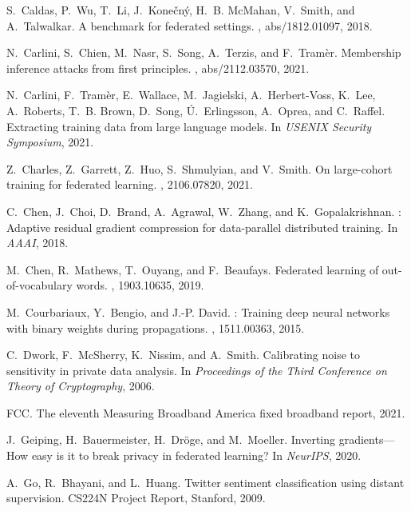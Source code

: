 \documentclass[11pt]{article}
\begin{document}
\begin{thebibliography}{10}
\begin{small}
S.~Caldas, P.~Wu, T.~Li, J.~Kone{\v{c}}n{\'y}, H.~B. McMahan, V.~Smith, and
  A.~Talwalkar.
 {A} benchmark for federated settings.
, abs/1812.01097, 2018.

N.~Carlini, S.~Chien, M.~Nasr, S.~Song, A.~Terzis, and F.~Tram{\`{e}}r.
\newblock Membership inference attacks from first principles.
, abs/2112.03570, 2021.

N.~Carlini, F.~Tram{\`{e}}r, E.~Wallace, M.~Jagielski, A.~Herbert{-}Voss,
  K.~Lee, A.~Roberts, T.~B. Brown, D.~Song, {\'{U}}.~Erlingsson, A.~Oprea, and
  C.~Raffel.
\newblock Extracting training data from large language models.
\newblock In {\em {USENIX} Security Symposium}, 2021.

Z.~Charles, Z.~Garrett, Z.~Huo, S.~Shmulyian, and V.~Smith.
\newblock On large-cohort training for federated learning.
, 2106.07820, 2021.

C.~Chen, J.~Choi, D.~Brand, A.~Agrawal, W.~Zhang, and K.~Gopalakrishnan.
: Adaptive residual gradient compression for data-parallel
  distributed training.
\newblock In {\em AAAI}, 2018.

M.~Chen, R.~Mathews, T.~Ouyang, and F.~Beaufays.
\newblock Federated learning of out-of-vocabulary words.
, 1903.10635, 2019.

M.~Courbariaux, Y.~Bengio, and J.-P. David.
: Training deep neural networks with binary weights
  during propagations.
, 1511.00363, 2015.

C.~Dwork, F.~McSherry, K.~Nissim, and A.~Smith.
\newblock Calibrating noise to sensitivity in private data analysis.
\newblock In {\em Proceedings of the Third Conference on Theory of
  Cryptography}, 2006.

FCC.
\newblock The eleventh {Measuring Broadband America} fixed broadband report,
  2021.

J.~Geiping, H.~Bauermeister, H.~Dr\"{o}ge, and M.~Moeller.
\newblock Inverting gradients---{H}ow easy is it to break privacy in federated
  learning?
\newblock In {\em NeurIPS}, 2020.

A.~Go, R.~Bhayani, and L.~Huang.
\newblock Twitter sentiment classification using distant supervision.
\newblock CS224N Project Report, Stanford, 2009.


\end{small}
\end{thebibliography}
\end{document}
